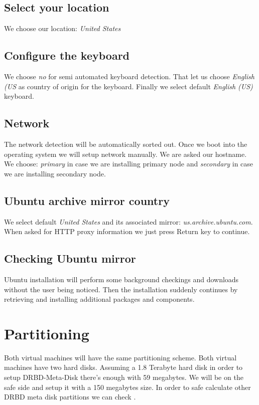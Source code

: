 \subsection {Select your location}
We choose our location: \textit{United States}
\subsection {Configure the keyboard}
We choose \textit{no} for semi automated keyboard detection. That let us choose \textit{English (US} as country of origin for the keyboard. Finally we select default \textit{English (US)} keyboard.
\subsection {Network}
The network detection will be automatically sorted out. Once we boot into the operating system we will setup network manually. We are asked our hostname. We choose: \textit{primary} in case we are installing primary node and \textit{secondary} in case we are installing secondary node.
\subsection {Ubuntu archive mirror country}
We select default \textit{United States} and its associated mirror: \textit{us.archive.ubuntu.com}. When asked for HTTP proxy information we just press Return key to continue.
\subsection {Checking Ubuntu mirror}
Ubuntu installation will perform some background checkings and downloads without the user being noticed. Then the installation suddenly continues by retrieving and installing additional packages and components.






\section {Partitioning}
Both virtual machines will have the same partitioning scheme. Both virtual machines have two hard disks.
Assuming a 1.8 Terabyte hard disk in order to setup DRBD-Meta-Disk there's enough with 59 megabytes. We will be on the safe side and setup it with a 150 megabytes size. In order to safe calculate other DRBD meta disk partitions we can check \cite{LinbitDRBDInternals}.

